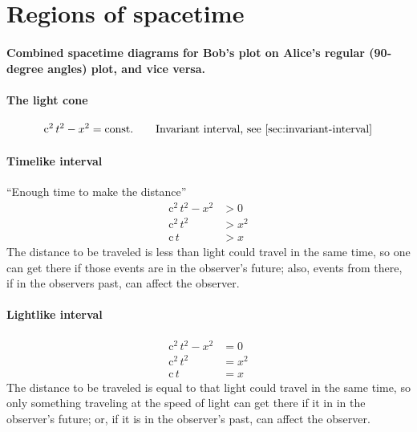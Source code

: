 \documentclass[pagesize,headsepline,10pt,parskip=half]{scrreprt}
\newcommand{\const}[1]{\ensuremath{\mathrm{#1}}}
\renewcommand{\c}{\const{c}}
\begin{document}
    \section{Regions of spacetime}
      \paragraph{Combined spacetime diagrams for Bob’s plot on Alice’s regular (90‐degree angles) plot, and vice versa.}

      \paragraph{The light cone}
        \begin{align*}
          \c^2 \, t^2 - x^2 = \text{const.} \qquad \text{Invariant interval, see~\ref{sec:invariant-interval}}
        \end{align*}

      \paragraph{Timelike interval}
        ``Enough time to make the distance''
        \begin{align*}
          \c^2 \, t^2 - x^2 &> 0\\
          \c^2 \, t^2 &> x^2\\
          \c \, t &> x
        \end{align*}
        The distance to be traveled is less than light could travel
        in the same time, so one can get there if those events are
        in the observer's future; also, events from there,
        if in the observers past, can affect the observer.

      \paragraph{Lightlike interval}
        \begin{align*}
          \c^2 \, t^2 - x^2 &= 0\\
          \c^2 \, t^2 &= x^2\\
          \c \, t &= x
        \end{align*}
        The distance to be traveled is equal to that light could travel
        in the same time, so only something traveling at the speed of light
        can get there if it in in the observer's future; or, if it is in
        the observer's past, can affect the observer.
\end{document}
